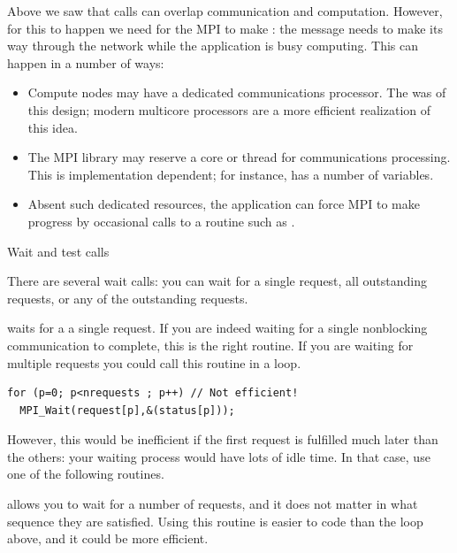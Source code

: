 Above we saw that  calls can overlap communication and
computation. However, for this to happen we need for the MPI to make
: the message needs to make its way
through the network while the application is busy computing.
This can happen in a number of ways:
\begin{itemize}
\item Compute nodes may have a dedicated communications processor. The
   was of this design; modern
  multicore processors are a more efficient realization of this idea.
\item The MPI library may reserve a core or thread for communications
  processing. This is implementation dependent; for instance,
   has a number of
   variables.
\item Absent such dedicated resources, the application can force MPI
  to make progress by occasional calls to a 
  routine such as .
\end{itemize}


 {Wait and test calls}
\label{sec:waittest}

There are several wait calls: you can wait for a single request, all
outstanding requests, or any of the outstanding requests.


 waits for a a single request. If you are
indeed waiting for a single nonblocking communication to complete,
this is the right routine. If you are waiting for multiple requests
you could call this routine in a loop.

\begin{lstlisting}
for (p=0; p<nrequests ; p++) // Not efficient!
  MPI_Wait(request[p],&(status[p]));
\end{lstlisting}

However, this would be inefficient if the first request is fulfilled
much later than the others: your waiting process would have lots of
idle time. In that case, use one of the following routines.

  
 allows you to wait for a number of
requests, and it does not matter in what sequence they are
satisfied. Using this routine is easier to code than the loop above,
and it could be more efficient.

